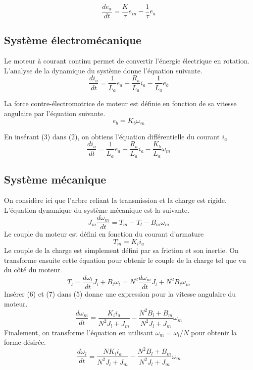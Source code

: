 \documentclass{udes_rapport} %
\begin{document}
\begin{equation}
\frac{de_a}{dt} = \frac{K}{\tau}e_{in} - \frac{1}{\tau}e_a
\end{equation}

\subsection{Système électromécanique}
Le moteur à courant continu permet de convertir l'énergie électrique en rotation. 
L'analyse de la dynamique du système donne l'équation suivante.
\begin{equation}
\frac{di_a}{dt} = \frac{1}{L_a}e_a-\frac{R_a}{L_a}i_a - \frac{1}{L_a}e_b
\end{equation}

La force contre-électromotrice de moteur est définie en fonction de sa vitesse angulaire par l'équation suivante.
\begin{equation}
e_b = K_b\omega_m
\end{equation}

En insérant (3) dans (2), on obtiens l'équation différentielle du courant $i_a$
\begin{equation}
\frac{di_a}{dt} = \frac{1}{L_a}e_a-\frac{R_a}{L_a}i_a - \frac{K_b}{L_a}\omega_m
\end{equation}

\subsection{Système mécanique}
On considère ici que l'arbre reliant la transmission et la charge est rigide.
L'équation dynamique du système mécanique est la suivante.
\begin{equation}
J_m\frac{d\omega_m}{dt} = T_m - T_l - B_m\omega_m
\end{equation}
Le couple du moteur est défini en fonction du courant d'armature
\begin{equation}
T_m = K_ii_a
\end{equation}
Le couple de la charge est simplement défini par sa friction et son inertie. On transforme ensuite cette équation pour obtenir le couple de la charge 
tel que vu du côté du moteur.
\begin{equation}
T_l = \frac{d\omega_l}{dt}J_l + B_l\omega_l = N^2\frac{d\omega_m}{dt}J_l + N^2B_l\omega_m
\end{equation} 
Insérer (6) et (7) dans (5) donne une expression pour la vitesse angulaire du moteur.
\[ \frac{d\omega_m}{dt} = \frac{K_ii_a}{N^2J_l + J_m} - \frac{N^2B_l + B_m}{N^2J_l + J_m}\omega_m \]
Finalement, on transforme l'équation en utilisant $\omega_m = \omega_l/N$ pour obtenir la forme désirée.
\begin{equation}
\frac{d\omega_l}{dt} = \frac{NK_ii_a}{N^2J_l + J_m} - \frac{N^2B_l + B_m}{N^2J_l + J_m}\omega_m
\end{equation} 
\end{document}
